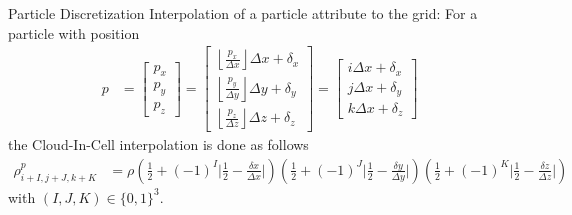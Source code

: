 \documentclass[5pt]{beamer}
\begin{document}



\begin{frame}{Particle Discretization}
  Interpolation of a particle attribute to the grid: For a particle with position
  {\scriptsize
  \begin{align}
  p &= \begin{bmatrix} p_x \\ p_y \\ p_z \end{bmatrix} = \begin{bmatrix}
      \left \lfloor{\frac{p_x}{\Delta x}}\right \rfloor \Delta x + \delta_x \\
      \left \lfloor{\frac{p_y}{\Delta y}}\right \rfloor \Delta y + \delta_y \\ 
      \left \lfloor{\frac{p_z}{\Delta z}}\right \rfloor \Delta z + \delta_z \end{bmatrix} = 
  \begin{bmatrix} i \Delta x + \delta_x \\ j \Delta x + \delta_y \\ k \Delta x + \delta_z \end{bmatrix}
  \end{align}
  }%
  the Cloud-In-Cell interpolation is done as follows
  {\scriptsize
  \begin{align}
  \rho^p_{i+I,j+J,k+K} &= \rho\left(\frac{1}{2} + (-1)^I \bigg\rvert \frac{1}{2} - \frac{\delta x}{\Delta x} \bigg\rvert \right)
                              \left(\frac{1}{2} + (-1)^J \bigg\rvert \frac{1}{2} - \frac{\delta y}{\Delta y} \bigg\rvert \right)
                              \left(\frac{1}{2} + (-1)^K \bigg\rvert \frac{1}{2} - \frac{\delta z}{\Delta z} \bigg\rvert \right)
  \end{align}
  with $(I,J,K) \in \{0,1\}^3$.
  }%
  \end{frame}
\end{document}
